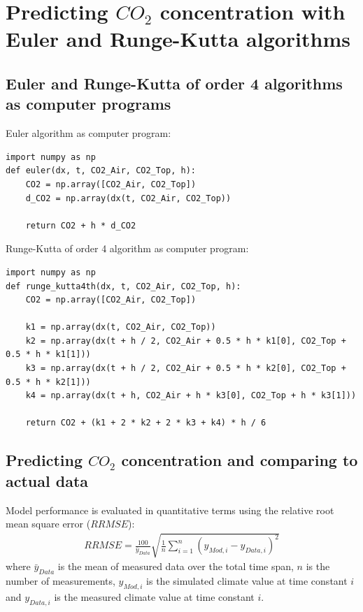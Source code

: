 \documentclass[a4paper]{article}
\newcommand*\mean[1]{\bar{#1}}
\begin{document}
\section{Predicting \texorpdfstring{\(CO_2\)}{} concentration with Euler and Runge-Kutta algorithms}
\subsection{Euler and Runge-Kutta of order 4 algorithms as computer programs}
Euler algorithm as computer program:
\begin{mdframed}[leftline=false,rightline=false,backgroundcolor=magenta!10,nobreak=true]
  \begin{verbatim}
import numpy as np
def euler(dx, t, CO2_Air, CO2_Top, h):
    CO2 = np.array([CO2_Air, CO2_Top])
    d_CO2 = np.array(dx(t, CO2_Air, CO2_Top))

    return CO2 + h * d_CO2
  \end{verbatim}
\end{mdframed}

Runge-Kutta of order 4 algorithm as computer program:
\begin{mdframed}[leftline=false,rightline=false,backgroundcolor=magenta!10,nobreak=true]
  \begin{verbatim}
import numpy as np
def runge_kutta4th(dx, t, CO2_Air, CO2_Top, h):
    CO2 = np.array([CO2_Air, CO2_Top])

    k1 = np.array(dx(t, CO2_Air, CO2_Top))
    k2 = np.array(dx(t + h / 2, CO2_Air + 0.5 * h * k1[0], CO2_Top + 0.5 * h * k1[1]))
    k3 = np.array(dx(t + h / 2, CO2_Air + 0.5 * h * k2[0], CO2_Top + 0.5 * h * k2[1]))
    k4 = np.array(dx(t + h, CO2_Air + h * k3[0], CO2_Top + h * k3[1]))

    return CO2 + (k1 + 2 * k2 + 2 * k3 + k4) * h / 6
  \end{verbatim}
\end{mdframed}

\subsection{Predicting \texorpdfstring{\(CO_2\)}{} concentration and comparing to actual data}

Model performance is evaluated in quantitative terms using the relative root mean square error (\(RRMSE\))\cite{kobayashi2000comparing}:
\begin{align}
  \label{eq:rrmse}
  RRMSE = \frac{100}{\mean{y}_{Data}} \sqrt{\frac{1}{n} \sum_{i=1}^{n} {\left(y_{Mod,i} - y_{Data,i}\right)}^2}
\end{align}
where \(\mean{y}_{Data}\) is the mean of measured data over the total time span, \(n\) is the number of measurements, \(y_{Mod,i}\) is the simulated climate value at time constant \(i\) and \(y_{Data,i}\) is the measured climate value at time constant \(i\).
\end{document}
